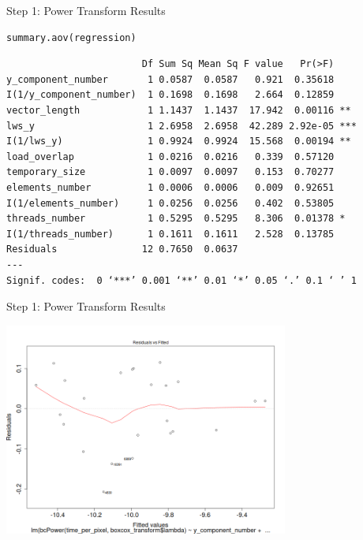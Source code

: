 \documentclass[10pt, compress, aspectratio=169, xcolor={table,usenames,dvipsnames}]{beamer}
\begin{document}
\begin{frame}[fragile,label={sec:org31cee48}]{Step 1: Power Transform Results}
 \scriptsize
\lstset{language=r,label= ,caption= ,captionpos=b,numbers=none}
\begin{lstlisting}
summary.aov(regression)
\end{lstlisting}

\begin{verbatim}
                        Df Sum Sq Mean Sq F value   Pr(>F)
y_component_number       1 0.0587  0.0587   0.921  0.35618
I(1/y_component_number)  1 0.1698  0.1698   2.664  0.12859
vector_length            1 1.1437  1.1437  17.942  0.00116 **
lws_y                    1 2.6958  2.6958  42.289 2.92e-05 ***
I(1/lws_y)               1 0.9924  0.9924  15.568  0.00194 **
load_overlap             1 0.0216  0.0216   0.339  0.57120
temporary_size           1 0.0097  0.0097   0.153  0.70277
elements_number          1 0.0006  0.0006   0.009  0.92651
I(1/elements_number)     1 0.0256  0.0256   0.402  0.53805
threads_number           1 0.5295  0.5295   8.306  0.01378 *
I(1/threads_number)      1 0.1611  0.1611   2.528  0.13785
Residuals               12 0.7650  0.0637
---
Signif. codes:  0 ‘***’ 0.001 ‘**’ 0.01 ‘*’ 0.05 ‘.’ 0.1 ‘ ’ 1
\end{verbatim}

\normalsize
\end{frame}
\begin{frame}[label={sec:org97cdd43}]{Step 1: Power Transform Results}
\begin{center}
\includegraphics[width=0.7\textwidth]{../img/regression_after_transform.png}
\end{center}
\end{frame}
\end{document}
